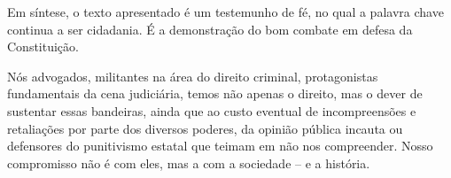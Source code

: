 Em síntese, o texto apresentado é um testemunho de fé, no qual a palavra
chave continua a ser cidadania. É a demonstração do bom combate em
defesa da Constituição.

Nós advogados, militantes na área do direito criminal, protagonistas
fundamentais da cena judiciária, temos não apenas o direito, mas o dever
de sustentar essas bandeiras, ainda que ao custo eventual de
incompreensões e retaliações por parte dos diversos poderes, da opinião
pública incauta ou defensores do punitivismo estatal que teimam em não
nos compreender. Nosso compromisso não é com eles, mas a com a sociedade
-- e a história.
